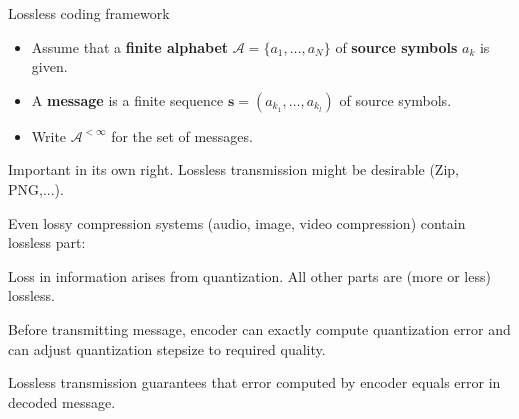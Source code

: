 \begin{frame}{Lossless coding framework}
\begin{itemize}
\item Assume that a \textbf{finite alphabet} $\mathcal{A}=\{a_1,\dots,a_N\}$ of \textbf{source symbols} $a_k$ is given. 
\item A \textbf{message} is a finite sequence $\textbf{s}=(a_{k_1},\dots,a_{k_l})$ of source symbols.
\item Write $\mathcal{A}^{<\infty}$ for the set of messages. 
\end{itemize}
\bit
\item Important in its own right. Lossless transmission might be desirable (Zip, PNG,...).
\item Even lossy compression systems (audio, image, video compression) contain lossless part:
\bit
\item Loss in information arises from quantization. All other parts are (more or less) lossless.
\item Before transmitting message, encoder can exactly compute quantization error and can adjust quantization stepsize
to required quality.  
\item Lossless transmission guarantees that error computed by encoder equals error in decoded message.  
\eit
\eit
\end{frame}


